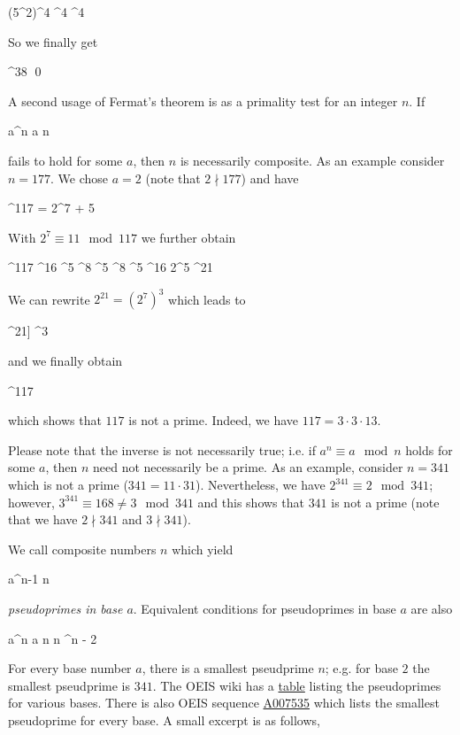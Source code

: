\bee
(5^2)^4 ^4 ^4   
\eee

So we finally get

^{38}     \qed
\eee

A second usage of Fermat's theorem is as a primality test for an integer $n$. If

\bee
a^n \equiv a \mod n
\eee

fails to hold for some $a$, then $n$ is necessarily composite. As an example consider $n = 177$. We chose $a = 2$ (note that $2 \nmid 177$)  and have

^{117} = 2^{7  + 5}
\eee

With $2^7 \equiv 11 \mod 117$ we further obtain

^{117} ^{16} ^5 ^8 ^5 ^8 ^5 ^{16} 2^5 ^{21} 
\eee

We can rewrite $2^{21} = (2^7)^3$ which leads to

^{21]} ^3      
\eee

and we finally obtain

^{117}    
\eee

which shows that $117$ is not a prime. Indeed, we have $117 = 3 \cdot 3 \cdot 13$.

Please note that the inverse is not necessarily true; i.e. if $a^{n} \equiv a \mod n$ holds for some $a$, then $n$ need not necessarily be a prime. As an example, consider $n = 341$ which is not a prime ($341 = 11 \cdot 31$). Nevertheless, we have $2^{341} \equiv 2 \mod 341$; however, $3^{341} \equiv 168 \neq 3 \mod 341$ and this shows that $341$ is not a prime (note that we have $2 \nmid 341$ and $3 \nmid 341$).

We call composite numbers $n$ which yield

\bee
a^{n-1}  \mod n
\eee

\emph{pseudoprimes in base $a$}. Equivalent conditions for pseudoprimes in base $a$ are also

\bee
a^n \equiv a \mod n \leftrightarrow n ^n - 2
\eee

For every base number $a$, there is a smallest pseudprime $n$; e.g. for base $2$ the smallest pseudprime is $341$. The OEIS wiki has a \href{https://oeis.org/wiki/Table_of_Fermat_pseudoprimes}{table} listing the pseudoprimes for various bases. There is also OEIS sequence \href{https://oeis.org/A007535}{A007535} which lists the smallest pseudoprime for every base. A small excerpt is as follows,

